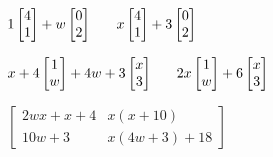 \documentclass{article}
\begin{document}
\vspace{0.5cm}
$1\left[\begin{matrix}4\\1\end{matrix}\right]+w\left[\begin{matrix}0\\2\end{matrix}\right]\hspace{0.5cm}$
$x\left[\begin{matrix}4\\1\end{matrix}\right]+3\left[\begin{matrix}0\\2\end{matrix}\right]\hspace{0.5cm}$
\vspace{0.5cm}

$x + 4\left[\begin{matrix}1\\w\end{matrix}\right]+4 w + 3\left[\begin{matrix}x\\3\end{matrix}\right]\hspace{0.5cm}$
$2 x\left[\begin{matrix}1\\w\end{matrix}\right]+6\left[\begin{matrix}x\\3\end{matrix}\right]\hspace{0.5cm}$
\vspace{0.5cm}

$\left[\begin{matrix}2 w x + x + 4 & x \left(x + 10\right)\\10 w + 3 & x \left(4 w + 3\right) + 18\end{matrix}\right]$
\end{document}
